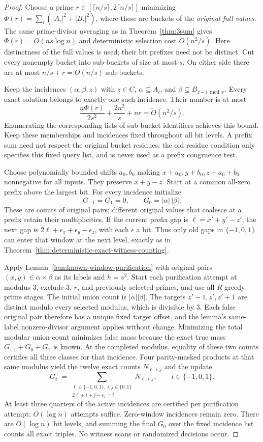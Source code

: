 \documentclass[11pt]{article}
\newcommand{\softO}{\widetilde O}
\begin{document}
\begin{proof}
Choose a prime $r\in[\lceil n/s\rceil,2\lceil n/s\rceil]$
minimizing
$\Phi(r)=\sum_i(|A_i|^2+|B_i|^2)$, where these are buckets of the
\emph{original full values}.  The same prime-divisor averaging as in
Theorem~\ref{thm:3sum} gives $\Phi(r)=O(ns\log n)$ and deterministic
selection cost $\softO(n^2/s)$.  Here distinctness of the full values
is used; their bit prefixes need not be distinct.  Cut every nonempty
bucket into sub-buckets of size at most $s$.  On either side there are
at most $n/s+r=O(n/s)$ sub-buckets.

Keep the incidences $(\alpha,\beta,z)$ with $z\in C$,
$\alpha\subseteq A_i$, and $\beta\subseteq B_{z-i\bmod r}$.
Every exact solution belongs to exactly one such incidence.  Their
number is at most
\[
 \frac{n\Phi(r)}{2s^2}+\frac{2n^2}{s}+nr
 =\softO(n^2/s).
\]
Enumerating the corresponding lists of sub-bucket identifiers achieves
this bound.  Keep these memberships and incidences fixed throughout
all bit levels.  A prefix sum need not respect the original bucket
residues: the old residue condition only specifies this fixed query
list, and is never used as a prefix congruence test.

Choose polynomially bounded shifts $a_0,b_0$ making
$x+a_0,y+b_0,z+a_0+b_0$ nonnegative for all inputs.  They preserve
$x+y-z$.  Start at a common all-zero prefix above the largest bit.
For every incidence initialize
\[
 G_{-1}=G_1=0,\qquad G_0=|\alpha|\,|\beta|.
\]
These are counts of original pairs; different original values that
coalesce at a prefix retain their multiplicities.  If the current
prefix gap is $\ell=x'+y'-z'$, the next gap is
$2\ell+\epsilon_x+\epsilon_y-\epsilon_z$, with each $\epsilon$ a
bit.  Thus only old gaps in $\{-1,0,1\}$ can enter that window at the
next level, exactly as in
Theorem~\ref{thm:deterministic-exact-witness-counting}.

Apply Lemma~\ref{lem:known-window-purification} with original pairs
$(x,y)\in\alpha\times\beta$ as its labels and $h=s^2$.  Start each
purification attempt at modulus $3$, exclude $3$, $r$, and previously
selected primes, and use all $R$ greedy prime stages.  The initial
union count is $|\alpha||\beta|$.  The targets $z'-1,z',z'+1$ are
distinct modulo every selected modulus, which is divisible by $3$.
Each false original pair therefore has a unique fixed target offset,
and the lemma's same-label nonzero-divisor argument applies without
change.  Minimizing the total modular union count minimizes false
mass because the exact true mass $G_{-1}+G_0+G_1$ is known.  At the
completed modulus, equality of these two counts certifies all three
classes for that incidence.  Four parity-masked products at that same
modulus yield the twelve exact counts $N_{\ell,i,j}$ and the update
\[
 G_t^+=\sum_{\substack{\ell\in\{-1,0,1\},\ i,j\in\{0,1\}\\
                 2\ell+i+j-\epsilon_z=t}}N_{\ell,i,j},
 \qquad t\in\{-1,0,1\}.
\]
At least three quarters of the active incidences are certified per
purification attempt; $O(\log n)$ attempts suffice.  Zero-window
incidences remain zero.  There are $O(\log n)$ bit levels, and summing
the final $G_0$ over the fixed incidence list counts all exact triples.
No witness scans or randomized decisions occur.


\end{proof}
\end{document}
